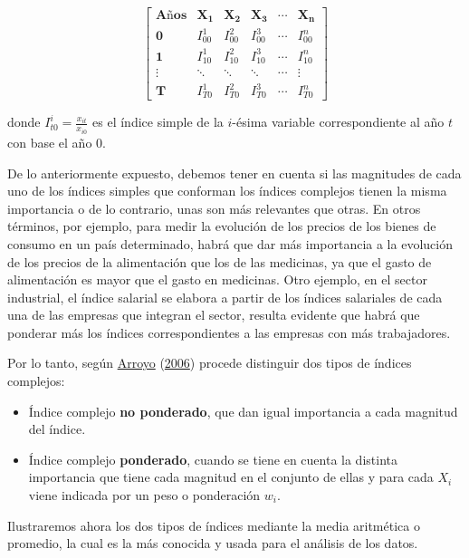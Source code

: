 \documentclass[
  11pt,
]{book}
\begin{document}
\[
\begin{equation}
\begin{bmatrix}
  \textbf{Años} & \mathbf{X_1} & \mathbf{X_2} & \mathbf{X_3} &\cdots & \mathbf{X_n}\\
     \mathbf{0}& I_{00}^{1} & I_{00}^{2} & I_{00}^{3} & \cdots & I_{00}^{n}\\
    \mathbf{1} & I_{10}^{1} & I_{10}^{2} & I_{10}^{3} & \cdots & I_{10}^{n}\\
     \vdots & \ddots & \ddots & \ddots & \cdots & \vdots\\
     \mathbf{T} & I_{T0}^{1} & I_{T0}^{2} & I_{T0}^{3} & \cdots & I_{T0}^{n}
    \end{bmatrix}
\end{equation}
\]

donde \(I_{t0}^{i}=\frac{x_{it}}{x_{i0}}\) es el índice simple de la \(i\)-ésima variable correspondiente al año \(t\) con base el año 0.

De lo anteriormente expuesto, debemos tener en cuenta si las magnitudes de cada uno de los índices simples que conforman los índices complejos tienen la misma importancia o de lo contrario, unas son más relevantes que otras. En otros términos, por ejemplo, para medir la evolución de los precios de los bienes de consumo en un país determinado, habrá que dar más importancia a la evolución de los precios de la alimentación que los de las medicinas, ya que el gasto de alimentación es mayor que el gasto en medicinas. Otro ejemplo, en el sector industrial, el índice salarial se elabora a partir de los índices salariales de cada una de las empresas que integran el sector, resulta evidente que habrá que ponderar más los índices correspondientes a las empresas con más trabajadores.

Por lo tanto, según \protect\hyperlink{ref-arroyo2006manual}{Arroyo} (\protect\hyperlink{ref-arroyo2006manual}{2006}) procede distinguir dos tipos de índices complejos:

\begin{itemize}
\item
  Índice complejo \textbf{no ponderado}, que dan igual importancia a cada magnitud del índice.
\item
  Índice complejo \textbf{ponderado}, cuando se tiene en cuenta la distinta importancia que tiene cada magnitud en el conjunto de ellas y para cada \(X_i\) viene indicada por un peso o ponderación \(w_i\).
\end{itemize}

Ilustraremos ahora los dos tipos de índices mediante la media aritmética o promedio, la cual es la más conocida y usada para el análisis de los datos.
\end{document}
